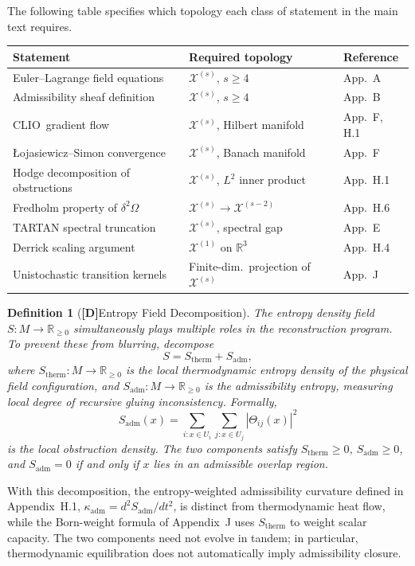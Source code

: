 \documentclass[12pt,a4paper]{article}
\newcommand{\claimD}{\textbf{[D]}\;}
\newtheorem{defn}{Definition}[section]
\newcommand{\CLIO}{\textrm{CLIO}}
\newcommand{\Field}{\mathcal{X}}
\begin{document}
The following table specifies which topology each class of statement in the
main text requires.

\bigskip
\begin{center}
\begin{tabular}{lll}
\toprule
\textbf{Statement} & \textbf{Required topology} & \textbf{Reference}\\
\midrule
Euler--Lagrange field equations & $\Field^{(s)}$, $s\geq 4$ & App.\ A\\
Admissibility sheaf definition & $\Field^{(s)}$, $s\geq 4$ & App.\ B\\
\CLIO\ gradient flow & $\Field^{(s)}$, Hilbert manifold & App.\ F, H.1\\
Łojasiewicz--Simon convergence & $\Field^{(s)}$, Banach manifold & App.\ F\\
Hodge decomposition of obstructions & $\Field^{(s)}$, $L^2$ inner product & App.\ H.1\\
Fredholm property of $\delta^2\Omega$ & $\Field^{(s)}\to\Field^{(s-2)}$ & App.\ H.6\\
TARTAN spectral truncation & $\Field^{(s)}$, spectral gap & App.\ E\\
Derrick scaling argument & $\Field^{(1)}$ on $\mathbb{R}^3$ & App.\ H.4\\
Unistochastic transition kernels & Finite-dim.\ projection of $\Field^{(s)}$ & App.\ J\\
\bottomrule
\end{tabular}
\end{center}

\bigskip

\begin{defn}[\claimD Entropy Field Decomposition]
The entropy density field $S:M\to\mathbb{R}_{\geq 0}$ simultaneously plays
multiple roles in the reconstruction program. To prevent these from blurring,
decompose
\[
S = S_\mathrm{therm} + S_\mathrm{adm},
\]
where $S_\mathrm{therm}:M\to\mathbb{R}_{\geq 0}$ is the local thermodynamic
entropy density of the physical field configuration, and
$S_\mathrm{adm}:M\to\mathbb{R}_{\geq 0}$ is the admissibility entropy,
measuring local degree of recursive gluing inconsistency. Formally,
\[
S_\mathrm{adm}(x)
= \sum_{i: x\in U_i}\sum_{j: x\in U_j} |\Theta_{ij}(x)|^2
\]
is the local obstruction density. The two components satisfy
$S_\mathrm{therm}\geq 0$, $S_\mathrm{adm}\geq 0$, and
$S_\mathrm{adm}=0$ if and only if $x$ lies in an admissible overlap region.
\end{defn}

With this decomposition, the entropy-weighted admissibility curvature defined
in Appendix~H.1, $\kappa_\mathrm{adm}=d^2S_\mathrm{adm}/dt^2$, is distinct
from thermodynamic heat flow, while the Born-weight formula of Appendix~J uses
$S_\mathrm{therm}$ to weight scalar capacity. The two components need not evolve
in tandem; in particular, thermodynamic equilibration does not automatically
imply admissibility closure.
\end{document}
